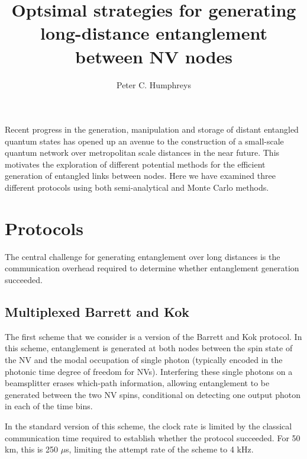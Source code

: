 \documentclass[aps,pra,superscriptaddress,preprint]{revtex4-1}
\begin{document}
\title{Optsimal strategies for generating long-distance entanglement between NV nodes}

\author{Peter C. Humphreys}


\begin{abstract}
\end{abstract}

Recent progress in the generation, manipulation and storage of distant entangled quantum states has opened up an avenue to the construction of a small-scale quantum network over metropolitan scale distances in the near future. This motivates the exploration of different potential methods for the efficient generation of entangled links between nodes. Here we have examined three different protocols using both semi-analytical and Monte Carlo methods. 

\section{Protocols}

The central challenge for generating entanglement over long distances is the communication overhead required to determine whether entanglement generation succeeded. 

\subsection{Multiplexed Barrett and Kok}

The first scheme that we consider is a version of the Barrett and Kok protocol. In this scheme, entanglement is generated at both nodes between the spin state of the NV and the modal occupation of single photon (typically encoded in the photonic time degree of freedom for NVs). Interfering these single photons on a beamsplitter erases which-path information, allowing entanglement to be generated between the two NV spins, conditional on detecting one output photon in each of the time bins. 

In the standard version of this scheme, the clock rate is limited by the classical communication time required to establish whether the protocol succeeded. For 50 km, this is 250 $\mu$s, limiting the attempt rate of the scheme to 4 kHz.  
\end{document}
